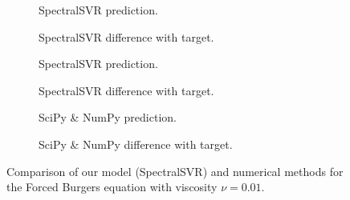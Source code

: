 \begin{figure}[H]
  \centering
  \begin{adjustwidth}{-0.05\linewidth}{-0.05\linewidth}
    \begin{subfigure}{0.49\linewidth}
      \begin{adjustbox}{width=\linewidth}
        
      \end{adjustbox}
      \caption{SpectralSVR prediction.}\label{fig:comp_lssvr_pred_0.01}
    \end{subfigure}
    \begin{subfigure}{0.49\linewidth}
      \begin{adjustbox}{width=\linewidth}
        
      \end{adjustbox}
      \caption{SpectralSVR difference with target.}\label{fig:comp_lssvr_diff_0.01}
    \end{subfigure}
    \begin{subfigure}{0.49\linewidth}
      \begin{adjustbox}{width=\linewidth}
        
      \end{adjustbox}
      \caption{SpectralSVR prediction.}\label{fig:comp_fnn_pred_0.01}
    \end{subfigure}
    \begin{subfigure}{0.49\linewidth}
      \begin{adjustbox}{width=\linewidth}
        
      \end{adjustbox}
      \caption{SpectralSVR difference with target.}\label{fig:comp_fnn_diff_0.01}
    \end{subfigure}
    \begin{subfigure}{0.49\linewidth}
      \begin{adjustbox}{width=\linewidth}
        
      \end{adjustbox}
      \caption{SciPy \& NumPy prediction.}\label{fig:comp_spo_pred_0.01}
    \end{subfigure}
    \begin{subfigure}{0.49\linewidth}
      \begin{adjustbox}{width=\linewidth}
        
      \end{adjustbox}
      \caption{SciPy \& NumPy difference with target.}\label{fig:comp_spo_diff_0.01}
    \end{subfigure}
  \end{adjustwidth}
  \caption{Comparison of our model (SpectralSVR) and numerical methods for the Forced Burgers equation with viscosity \(\nu=0.01\).}\label{fig:comparison_burgers_0.01}
\end{figure}
